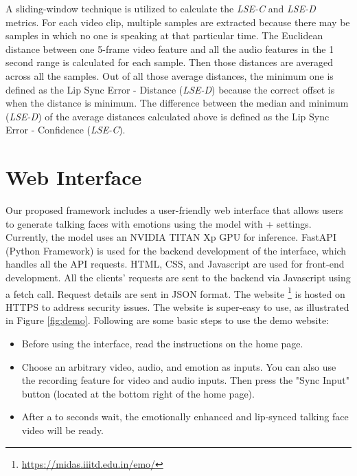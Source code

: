 \documentclass[accepted]{uai2023}
\begin{document}
A sliding-window technique is utilized to calculate the \emph{LSE-C} and \emph{LSE-D} metrics. For each video clip, multiple samples are extracted because there may be samples in which no one is speaking at that particular time. The Euclidean distance between one 5-frame video feature and all the audio features in the 1 second range is calculated for each sample. Then those distances are averaged across all the samples. Out of all those average distances, the minimum one is defined as the Lip Sync Error - Distance (\emph{LSE-D}) because the correct offset is when the distance is minimum.
The difference between the median and minimum (\emph{LSE-D}) of the average distances calculated above is defined as the Lip Sync Error - Confidence (\emph{LSE-C}). 

\section{Web Interface}
Our proposed framework includes a user-friendly web interface \cite{goyal2022emotional} that allows users to generate talking faces with emotions using the model with + settings. Currently, the model uses an NVIDIA TITAN Xp GPU for inference.
FastAPI (Python Framework) is used for the backend development of the interface, which handles all the API requests. HTML, CSS, and Javascript are used for front-end development. All the clients' requests are sent to the backend via Javascript using a fetch call. Request details are sent in JSON format. The website
\footnote{\href{https://midas.iiitd.edu.in/emo/}{https://midas.iiitd.edu.in/emo/}} 
is hosted on HTTPS to address security issues. The website is super-easy to use, as illustrated in Figure \ref{fig:demo}. Following are some basic steps to use the demo website:
\begin{itemize}
    \item Before using the interface, read the instructions on the home page.
    \item Choose an arbitrary video, audio, and emotion as inputs. You can also use the recording feature for video and audio inputs. Then press the "Sync Input" button (located at the bottom right of the home page).
    \item After a  to  seconds wait, the emotionally enhanced and lip-synced talking face video will be ready.
\end{itemize}
\end{document}

